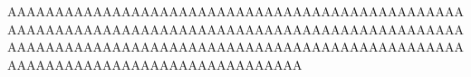 \documentclass{article}
\begin{document}
AAAAAAAAAAAAAAAAAAAAAAAAAAAAAAAAAAAAAAAAAAAAAAAAAAAAAAAAAAAAAAAAAAAAAAAAAAAAAAAAAAAAAAAAAAAAAAAAAAAAAAAAAAAAAAAAAAAAAAAAAAAAAAAAAAAAAAAAAAAAAAAAAAAAAAAAAAAAAAAAAAAAAAAAAAAAAAA
\end{document}
